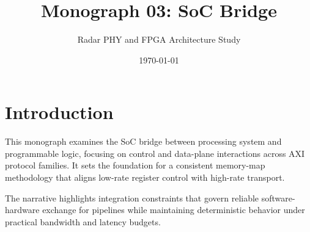\documentclass[11pt]{article}
\title{Monograph 03: SoC Bridge}
\author{Radar PHY and FPGA Architecture Study}
\date{\today}
\begin{document}
\maketitle

\section{Introduction}
This monograph examines the SoC bridge between processing system and programmable logic, focusing on control and data-plane interactions across AXI protocol families. It sets the foundation for a consistent memory-map methodology that aligns low-rate register control with high-rate \AXIStream transport.

The narrative highlights integration constraints that govern reliable software-hardware exchange for \IandQ pipelines while maintaining deterministic behavior under practical bandwidth and latency budgets.



\end{document}
